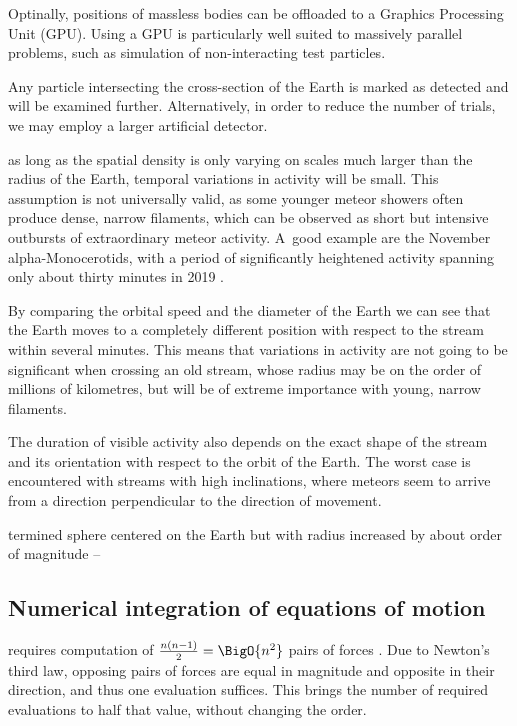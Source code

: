     Optinally, positions of massless bodies can be offloaded to a Graphics Processing Unit (GPU).
    Using a GPU is particularly well suited to massively parallel problems, such as simulation of non-interacting test particles.

    Any particle intersecting the cross-section of the Earth is marked as detected and will be examined further.
    Alternatively, in order to reduce the number of trials, we may employ a larger artificial detector.


    as long as the spatial density is only varying on scales much larger than the radius of the Earth,
    temporal variations in activity will be small.
    This assumption is not universally valid, as some younger meteor showers often produce dense, narrow filaments,
    which can be observed as short but intensive outbursts of extraordinary meteor activity.
    A~good example are the November alpha-Monocerotids, with a period of significantly
    heightened activity spanning only about thirty minutes in 2019 \citep{CBET4692}.

    By comparing the orbital speed and the diameter of the Earth we can see that the Earth moves
    to a completely different position with respect to the stream within several minutes.
    This means that variations in activity are not going to be significant when crossing an old stream,
    whose radius may be on the order of millions of kilometres, but will be of extreme importance with young, narrow filaments.

    The duration of visible activity also depends on the exact shape of the stream and its orientation with respect to the orbit of the Earth.
    The worst case is encountered with streams with high inclinations, where meteors seem to arrive from a direction perpendicular
    to the direction of movement.



    termined sphere centered on the Earth but with
    radius increased by about  order of magnitude --

    \subsection{Numerical integration of equations of motion} \label{asi}
        requires computation of $\frac{n\left(n - 1\right)}{2} = \BigO{n^2}$ pairs of forces \cite{...}.
        Due to Newton's third law, opposing pairs of forces are equal in magnitude and opposite in their direction,
        and thus one evaluation suffices. This brings the number of required evaluations to half that value,
        without changing the order.


